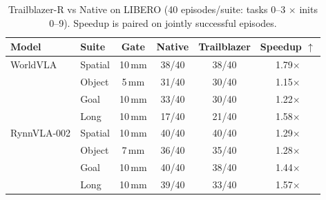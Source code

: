 \begin{table}[t]
\centering
\small
\caption{Trailblazer-R vs Native on LIBERO (40 episodes/suite: tasks 0--3 $\times$ inits 0--9). Speedup is paired on jointly successful episodes.}
\label{tab:trailblazer-libero-40}
\begin{tabular}{llcccc}
\toprule
Model & Suite & Gate & Native & Trailblazer & Speedup $\uparrow$ \\
\midrule
WorldVLA & Spatial & 10\,mm & 38/40 & 38/40 & 1.79$\times$ \\
 & Object & 5\,mm & 31/40 & 30/40 & 1.15$\times$ \\
 & Goal & 10\,mm & 33/40 & 30/40 & 1.22$\times$ \\
 & Long & 10\,mm & 17/40 & 21/40 & 1.58$\times$ \\
\midrule
RynnVLA-002 & Spatial & 10\,mm & 40/40 & 40/40 & 1.29$\times$ \\
 & Object & 7\,mm & 36/40 & 35/40 & 1.28$\times$ \\
 & Goal & 10\,mm & 40/40 & 38/40 & 1.44$\times$ \\
 & Long & 10\,mm & 39/40 & 33/40 & 1.57$\times$ \\
\bottomrule
\end{tabular}
\end{table}
